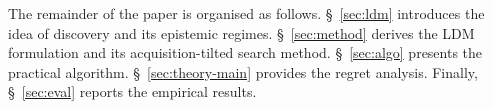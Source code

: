 The remainder of the paper is organised as follows.
\S~\ref{sec:ldm} introduces the idea of discovery and its epistemic regimes.
\S~\ref{sec:method} derives the LDM formulation and its acquisition-tilted search method. \S~\ref{sec:algo} presents the practical algorithm.
\S~\ref{sec:theory-main} provides the regret analysis.
Finally, \S~\ref{sec:eval} reports the empirical results.

